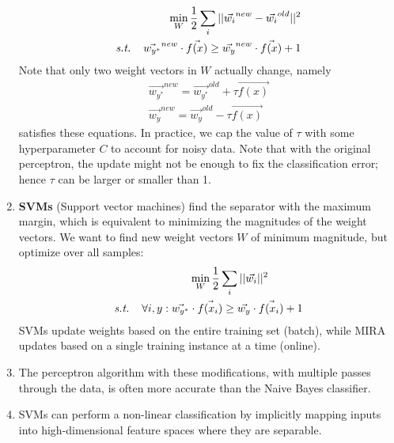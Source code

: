 \documentclass[10pt]{article}
\begin{document}
\begin{multicols}{2}
\begin{addmargin}[0.8em]{0.5em}
\begin{enumerate}[label=(\alph*)]
        \begin{align*}
            \min_{W} \frac{1}{2}\sum_{i} ||\vec{w_i}^{new}-\vec{w_i}^{old}||^2 \\ \textit{s.t.} \hspace{4mm} \vec{w_{y^*}}^{new} \cdot \vec{f(x)} \geq \vec{w_{y}}^{new} \cdot \vec{f(x)} + 1
        \end{align*}
        Note that only two weight vectors in $W$ actually change, namely
        \begin{align*}
            \vec{w_{y^*}}^{new} = \vec{w_{y^*}}^{old} + \tau \vec{f(x)} \\
            \vec{w_{y}}^{new} = \vec{w_{y}}^{old} - \tau \vec{f(x)} 
        \end{align*}
        satisfies these equations. In practice, we cap the value of $\tau$ with some hyperparameter $C$ to account for noisy data.
        Note that with the original perceptron, the update might not be enough to fix the classification error; hence $\tau$ can be larger or smaller than 1.
        \item \textbf{SVMs} (Support vector machines) find the separator with the maximum margin, which is equivalent to minimizing the magnitudes of the weight vectors. We want to find new weight vectors $W$ of minimum magnitude, but optimize over all samples:
        \begin{align*}
            &\min_{W} \frac{1}{2}\sum_{i} ||\vec{w_i}||^2 \\ \textit{s.t.} \hspace{4mm} \forall i, y: \vec{w_{y^*}} &\cdot \vec{f(x_i)} \geq \vec{w_{y}} \cdot \vec{f(x_i)} + 1
        \end{align*}
        SVMs update weights based on the entire training set (batch), while MIRA updates based on a single training instance at a time (online).
        \item The perceptron algorithm with these modifications, with multiple passes through the data, is often more accurate than the Naive Bayes classifier.
        \item SVMs can perform a non-linear classification by implicitly mapping inputs into high-dimensional feature spaces where they are separable.
    \end{enumerate}

\end{addmargin}
\end{multicols}
\end{document}
